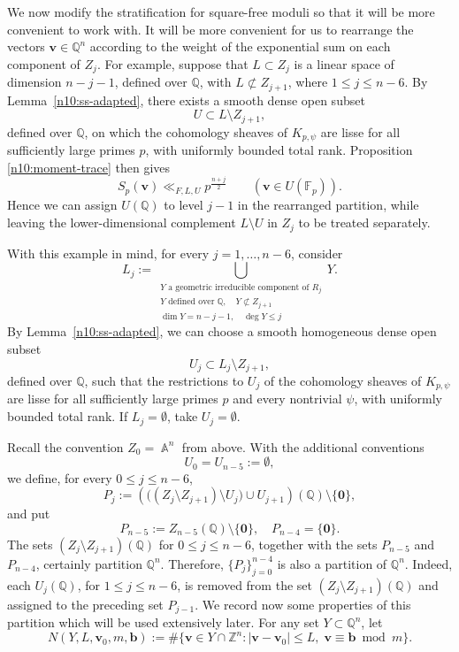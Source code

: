\documentclass[a4paper,11pt, twoside,reqno]{amsart}
\theoremstyle{plain}
\theoremstyle{definition}
\theoremstyle{remark}
\newcommand{\bfb}{\bm{b}}
\newcommand{\bfv}{\bm{v}}
\newcommand{\ZZ}{\mathbb{Z}}
\newcommand{\QQ}{\mathbb{Q}}
\DeclareMathOperator{\A}{\mathbb{A}}
\renewcommand{\le}{\leqslant}
\renewcommand{\leq}{\leqslant}
\newcommand{\FF}{\mathbb{F}}
\numberwithin{equation}{section}
\begin{document}
We now modify the stratification for square-free moduli
so that it will be more convenient to work with.
It will be more convenient for us to rearrange the vectors
$\bfv\in\QQ^n$ according to the weight of the exponential sum
on each component of $Z_j$.
For example, suppose that $L\subset Z_j$ is a linear space of
dimension $n-j-1$, defined over $\QQ$, with
$L\not\subset Z_{j+1}$, where $1\le j\le n-6$.
By Lemma~\ref{n10:ss-adapted},
there exists a smooth
dense open subset
\[
U\subset L\setminus Z_{j+1},
\]
defined over $\QQ$, on which the cohomology sheaves of
$K_{p,\psi}$ are lisse for all sufficiently large primes $p$,
with uniformly bounded total rank.
Proposition \ref{n10:moment-trace} then gives
\[
S_p(\bfv)\ll_{F,L,U}p^{\frac{n+j}{2}}
\qquad (\bfv\in U(\FF_p)).
\]
Hence we can assign $U(\QQ)$ to level $j-1$ in the rearranged
partition, while leaving the lower-dimensional complement
$L\setminus U$ in $Z_j$ to be treated separately.

With this example in mind, for every $j=1,\ldots,n-6$, consider
\begin{equation}
\label{n10:promotion-loci}
L_j:=
\bigcup_{\substack{
Y\text{ a geometric irreducible component of }R_j\\
Y\text{ defined over }\QQ,\quad Y\not\subset Z_{j+1}\\
\dim Y=n-j-1,\quad \deg Y\leq j
}}
Y.
\end{equation}
By Lemma~\ref{n10:ss-adapted}, we can 
choose a smooth homogeneous dense open subset
\begin{equation}
\label{n10:promotion-opens}
U_j\subset
L_j\setminus Z_{j+1},
\end{equation}
defined over $\QQ$, such that the restrictions to $U_j$ of the
cohomology sheaves of $K_{p,\psi}$ are lisse for all sufficiently
large primes $p$ and every nontrivial $\psi$, with uniformly
bounded total rank. If $L_j=\emptyset$, take
$U_j=\emptyset$.

Recall the convention $Z_0=\A^n$ from above.
With the additional conventions
\[
U_0=U_{n-5}:=\emptyset,
\]
we define, for every $0\leq j\leq n-6$,
\begin{equation}
\label{n10:rational-partition}
P_j:=
\left(
\bigl((Z_j\setminus Z_{j+1})\setminus U_j\bigr)
\cup U_{j+1}
\right)(\QQ)\setminus\{\boldsymbol{0}\},
\end{equation}
and put
\[
P_{n-5}:=Z_{n-5}(\QQ)\setminus\{\bm0\},\quad P_{n-4}=\{\boldsymbol{0}\}.
\]
The sets $(Z_j\setminus Z_{j+1})(\QQ)$ for $0\le j\le n-6$,
together with the sets $P_{n-5}$ and $P_{n-4}$, certainly partition $\QQ^n$.
Therefore, $\{P_j\}_{j=0}^{n-4}$ is also a partition of $\QQ^n$.
Indeed, each $U_j(\QQ)$, for $1\le j\le n-6$, is removed from the set
$(Z_j\setminus Z_{j+1})(\QQ)$ and assigned to the preceding set $P_{j-1}$.
We record now some properties of this partition which will be used extensively later.
For any set $Y \subset \QQ^n$, let
\begin{equation*}
N(Y,L,\bfv_0,m,\bfb) :=
\#\{\bfv\in Y\cap\ZZ^n:
|\bfv-\bfv_0|\le L,\;
\bfv\equiv\bfb\bmod m\}.
\end{equation*}
\end{document}
